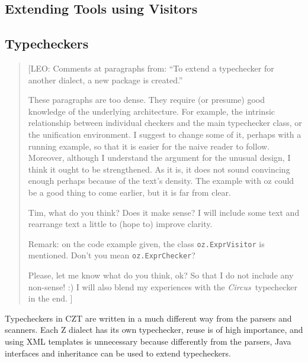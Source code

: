 \documentclass{llncs}
\newcommand{\Circus}{{\sf\slshape Circus}}
\begin{document}
\subsection{Extending Tools using Visitors}
\label{extending-visitors}


\subsection{Typecheckers}

\begin{quotation}
[LEO: Comments at paragraphs from: ``To extend a typechecker for another dialect,
      a new package is created.''

      \vspace{5pt}

      These paragraphs are too dense. They require (or presume) good knowledge of
      the underlying architecture. For example, the intrinsic relationship between
      individual checkers and the main typechecker class, or the unification environment.
      I suggest to change some of it, perhaps with a running example, so that it is easier
      for the naive reader to follow.
      Moreover, although I understand the argument for the unusual design,
      I think it ought to be strengthened. As it is, it does not sound convincing
      enough perhaps because of the text's density. The example with oz could be
      a good thing to come earlier, but it is far from clear.

      \vspace{5pt}

      Tim, what do you think? Does it make sense?
      I will include some text and rearrange text a little to (hope to) improve clarity.

      Remark: on the code example given, the class {\tt oz.ExprVisitor} is mentioned.
      Don't you mean {\tt oz.ExprChecker}?

      Please, let me know what do you think, ok? So that I do not include any non-sense! :)
      I will also blend my experiences with the \Circus\ typechecker in the end.
      ]
\end{quotation}

Typecheckers in CZT are written in a much different way from the parsers
and scanners. Each Z dialect has its own typechecker, reuse
is of high importance, and using XML templates is unnecessary because
differently from the parsers, Java interfaces and inheritance can be used to
extend typecheckers.
\end{document}
